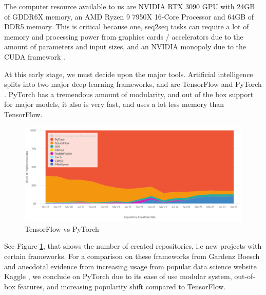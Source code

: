 \documentclass[preprint,11pt,review,authoryear]{elsarticle}
\begin{document}
The computer resource available to us are NVIDIA RTX 3090 GPU with 24GB of GDDR6X memory, an AMD Ryzen 9 7950X 16-Core Processor and 64GB of DDR5 memory. This is critical because one, seq2seq tasks can require a lot of memory and processing power from graphics cards / accelerators due to the amount of parameters and input sizes, and an NVIDIA monopoly due to the CUDA framework \cite{CUDAToolkitFree}.

At this early stage, we must decide upon the major tools. Artificial intelligence splits into two major deep learning frameworks, and are TensorFlow \cite{abadiTensorFlowSystemLargescale2016} and PyTorch \cite{paszkePyTorchImperativeStyle2019}. PyTorch has a tremendous amount of modularity, and out of the box support for major models, it also is very fast, and uses a lot less memory than TensorFlow.

\begin{figure}[h]
    \centering
    \includegraphics[width=1\textwidth]{images/pytorch-vs-tensorflow-popularity-comparison.png}
    \caption{TensorFlow vs PyTorch \cite{boeschPytorchVsTensorflow2023}}
    \label{fig: TensorFlow vs PyTorch}
\end{figure}

See Figure \ref{fig: TensorFlow vs PyTorch}, that shows the number of created repositories, i.e new projects with certain frameworks. For a comparison on these frameworks from Gardenz Boesch \cite{boeschPytorchVsTensorflow2023} and anecdotal evidence from increasing usage from popular data science website Kaggle \citep{anthonygoldbloomKaggleYourHome}, we conclude on PyTorch due to its ease of use modular system, out-of-box features, and increasing popularity shift compared to TensorFlow.
\end{document}
